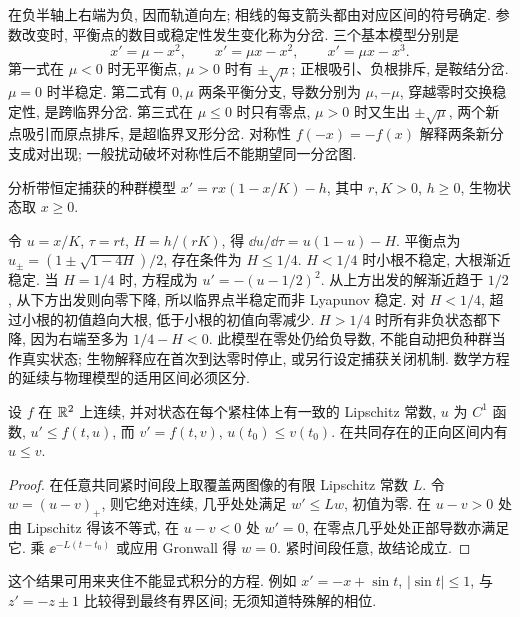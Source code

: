 在负半轴上右端为负, 因而轨道向左; 相线的每支箭头都由对应区间的符号确定.
参数改变时, 平衡点的数目或稳定性发生变化称为分岔. 三个基本模型分别是
\[
 x'=\mu-x^2,\qquad x'=\mu x-x^2,\qquad x'=\mu x-x^3.
\]
第一式在 $\mu<0$ 时无平衡点, $\mu>0$ 时有 $\pm\sqrt\mu$; 正根吸引、负根排斥, 是鞍结分岔. $\mu=0$ 时半稳定. 第二式有 $0,\mu$ 两条平衡分支, 导数分别为 $\mu,-\mu$, 穿越零时交换稳定性, 是跨临界分岔. 第三式在 $\mu\le0$ 时只有零点, $\mu>0$ 时又生出 $\pm\sqrt\mu$, 两个新点吸引而原点排斥, 是超临界叉形分岔. 对称性 $f(-x)=-f(x)$ 解释两条新分支成对出现; 一般扰动破坏对称性后不能期望同一分岔图.
\begin{example}
分析带恒定捕获的种群模型 $x'=rx(1-x/K)-h$, 其中 $r,K>0$, $h\ge0$, 生物状态取 $x\ge0$.
\end{example}
\begin{solution}
令 $u=x/K$, $\tau=rt$, $H=h/(rK)$, 得 $\dd u/\dd\tau=u(1-u)-H$. 平衡点为 $u_\pm=(1\pm\sqrt{1-4H})/2$, 存在条件为 $H\le1/4$. $H<1/4$ 时小根不稳定, 大根渐近稳定. 当 $H=1/4$ 时, 方程成为 $u'=-(u-1/2)^2$. 从上方出发的解渐近趋于 $1/2$, 从下方出发则向零下降, 所以临界点半稳定而非 Lyapunov 稳定. 对 $H<1/4$, 超过小根的初值趋向大根, 低于小根的初值向零减少. $H>1/4$ 时所有非负状态都下降, 因为右端至多为 $1/4-H<0$. 此模型在零处仍给负导数, 不能自动把负种群当作真实状态; 生物解释应在首次到达零时停止, 或另行设定捕获关闭机制. 数学方程的延续与物理模型的适用区间必须区分.
\end{solution}
\begin{proposition}[比较原理]
设 $f$ 在 $\mathbb R^2$ 上连续, 并对状态在每个紧柱体上有一致的 Lipschitz 常数, $u$ 为 $C^1$ 函数, $u'\le f(t,u)$, 而 $v'=f(t,v)$, $u(t_0)\le v(t_0)$. 在共同存在的正向区间内有 $u\le v$.
\end{proposition}
\begin{proof}
在任意共同紧时间段上取覆盖两图像的有限 Lipschitz 常数 $L$. 令 $w=(u-v)_+$, 则它绝对连续, 几乎处处满足 $w'\le Lw$, 初值为零. 在 $u-v>0$ 处由 Lipschitz 得该不等式, 在 $u-v<0$ 处 $w'=0$, 在零点几乎处处正部导数亦满足它. 乘 $\ee^{-L(t-t_0)}$ 或应用 Gronwall 得 $w=0$. 紧时间段任意, 故结论成立.
\end{proof}
这个结果可用来夹住不能显式积分的方程. 例如 $x'=-x+\sin t$, $|\sin t|\le1$, 与 $z'=-z\pm1$ 比较得到最终有界区间; 无须知道特殊解的相位.

